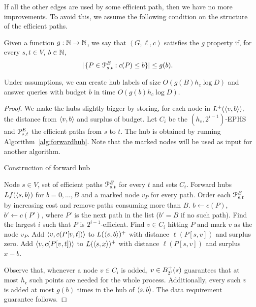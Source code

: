 \label{sec:frontier}
If all the other edges are used by some efficient path, then we have no more improvements.
To avoid this, we assume the following condition on the structure of the efficient paths.

\begin{definition}
Given a function $g:\mathbb{N}\to \mathbb{N}$, we say that $(G,\ell,c)$ satisfies the $g$ property if, for every $s,t\in V$, $b\in \mathbb{N}$,
\[
\lvert\{P\in\mathcal{P}_{s,t}^E: c(P)\leq b\}\rvert \leq g(b).
\]
\end{definition}

\begin{theorem}
Under assumptions, we can create hub labels of size $O(g(B)h_c\log D)$ and answer queries with budget $b$ in time $O(g(b)h_c\log D)$.
\end{theorem}
\begin{proof}
We make the hubs slightly bigger by storing, for each node in $L^+(\langle v,b\rangle)$,  the distance from $\langle v,b\rangle$ and surplus of budget.
Let $C_i$ be the $(h_c,2^{i-1})$-EPHS and $\mathcal{P}^E_{s,t}$ the efficient paths from $s$ to $t$.
The hub is obtained by running Algorithm~\ref{alg:forwardhub}.
Note that the marked nodes will be used as input for another algorithm.

\begin{algorithm}
\caption{Construction of forward hub}\label{alg:forwardhub}
\begin{algorithmic}[1]
\Require Node $s\in V$, set of efficient paths $\mathcal{P}^E_{s,t}$ for every $t$ and sets $C_i$.
\Ensure Forward hubs $Lf(\langle s,b\rangle)$ for $b=0,\ldots,B$ and a marked node $v_P$ for every path.
\State Order each $\mathcal{P}^E_{s,t}$ by increasing cost and remove paths consuming more than $B$.
		\State $b\gets c(P)$, $b'\gets c(P')$, where $P'$ is the next path in the list ($b'=B$ if no such path).
		\State Find the largest $i$ such that $P$ is $2^{i-1}$-efficient.
		\State Find $v\in C_i$ hitting $P$ and mark $v$ as the node $v_P$.
		\State Add $\langle v,c(P[v,t])\rangle$ to $L(\langle s,b\rangle)^+$  with distance $\ell(P[s,v])$ and surplus zero.
			\State Add $\langle v,c(P[v,t])\rangle$ to $L(\langle s,x\rangle)^+$  with distance $\ell(P[s,v])$ and surplus $x-b$.
		\EndFor
	\EndFor
\EndFor
\end{algorithmic}
\end{algorithm}

Observe that, whenever a node $v\in C_i$ is added, $v\in B^+_{2^i}(s)$ guarantees that at most $h_c$ such points are needed for the whole process.
Additionally, every such $v$ is added at most $g(b)$ times in the hub of $\langle s,b\rangle$.
The data requirement guarantee follows.


\end{proof}
